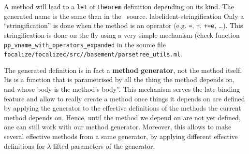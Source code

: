 A method will lead to a {\tt let} of {\tt theorem} definition
depending on its kind. The generated name is the same than in the
\focalize\ source.
label{ident-stringification}
Only a ``stringification'' is done when the method
is an operator (e.g. {\tt =}, {\tt +}, {\tt +=e}, \ldots). This
stringification is done on the fly using a very simple mechanism
(check function \\
{\tt pp\_vname\_with\_operators\_expanded} in the source
file \\
{\tt focalize/focalizec/src//basement/parsetree\_utils.ml}.

The generated definition is in fact a {\bf method generator}, not the
method itself. Its is a function that is parametrised by all the thing
the method depends on, and whose body is the method's body''. This
mechanism serves the late-binding feature and allow to really create a
method once things it depends on are defined by applying the generator
to the effective definitions of the methods the current method depends
on. Hence, until the method we depend on are not yet defined, one can
still work with our method generator. Moreover, this allows to make
several effective methods from a same generator, by applying
different effective definitions for $\lambda$-lifted  parameters of
the generator.

